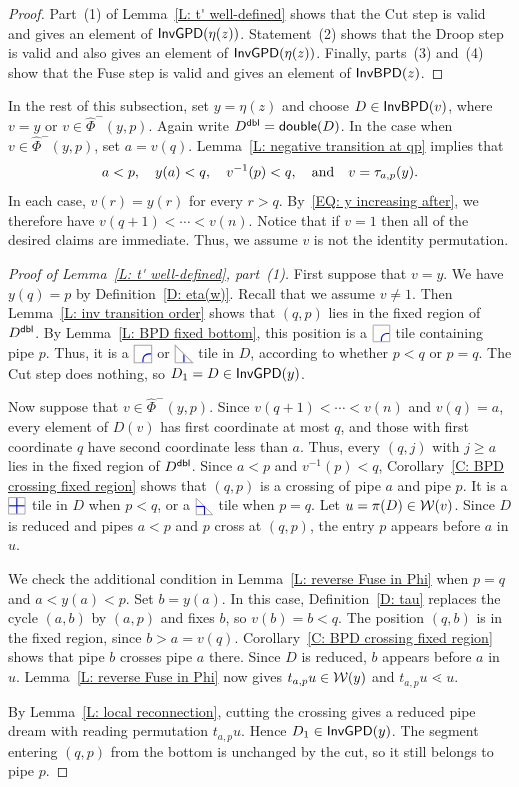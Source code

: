 \documentclass[10pt]{article}
\begin{document}
\begin{proof}
Part~(1) of Lemma~\ref{L: t' well-defined} shows that the  Cut
step is valid and gives an element of $\mathsf{InvGPD}(\eta(z))$.
Statement~(2) shows that the Droop step is valid and also gives an
element of $\mathsf{InvGPD}(\eta(z))$.
Finally, parts~(3) and~(4) show that the Fuse step is valid and
gives an element of $\mathsf{InvBPD}(z)$.
\end{proof}

In the rest of this subsection, set $y=\eta(z)$ and choose
$D\in\mathsf{InvBPD}(v)$, where $v=y$ or $v\in\hat\Phi^{-}(y,p)$.
Again write $D^{\mathsf{dbl}}=\mathsf{double}(D)$.
In the case when $v\in\hat\Phi^{-}(y,p)$, set $a=v(q)$.
Lemma~\ref{L: negative transition at qp} implies that 
\[a<p, \quad y(a)<q,
\quad v^{-1}(p)<q, \quad\text{and}\quad v=\tau_{a,p}(y).\]
In each case, $v(r)=y(r)$ for every $r>q$.
By~\eqref{EQ: y increasing after}, we therefore have
$v(q+1)<\cdots<v(n)$.
Notice that if $v=1$ then
all of the desired claims are immediate. 
Thus, we assume $v$ is not the identity permutation. 

\begin{proof}[Proof of Lemma~\ref{L: t' well-defined}, part~(1)]
First suppose that $v=y$.
We have $y(q)=p$ by Definition~\ref{D: eta(w)}.
Recall that we assume $v \neq 1$. 
Then Lemma~\ref{L: inv transition order} shows that $(q,p)$
lies in the fixed region of $D^{\mathsf{dbl}}$.
By Lemma~\ref{L: BPD fixed bottom}, this position is a $\CTILE$
tile containing pipe $p$.
Thus, it is a $\CTILE$ or $\CDIAG$ tile in $D$, according to whether
$p<q$ or $p=q$.
The Cut step does nothing, so $D_1=D\in\mathsf{InvGPD}(y)$.

Now suppose that $v\in\hat\Phi^{-}(y,p)$.
Since $v(q+1)<\cdots<v(n)$ and $v(q)=a$, every element of $D(v)$
has first coordinate at most $q$, and those with first coordinate $q$
have second coordinate less than $a$.
Thus, every $(q,j)$ with $j\geq a$ lies in the fixed region of $D^{\mathsf{dbl}}$.
Since $a<p$ and $v^{-1}(p)<q$, Corollary~\ref{C: BPD crossing fixed region}
shows that $(q,p)$ is a crossing of pipe $a$ and pipe $p$.
It is a $\PTILE$ tile in $D$ when $p<q$, or a $\PDIAG$ tile when $p=q$.
Let $u=\pi(D)\in\mathcal{W}(v)$.
Since $D$ is reduced and pipes $a<p$ and $p$ cross at $(q,p)$,
the entry $p$ appears before $a$ in $u$.

We check the additional condition in Lemma~\ref{L: reverse Fuse in Phi}
when $p=q$ and $a<y(a)<p$.
Set $b=y(a)$.
In this case, Definition~\ref{D: tau} replaces the cycle $(a,b)$
by $(a,p)$ and fixes $b$, so $v(b)=b<q$.
The position $(q,b)$ is in the fixed region, since $b>a=v(q)$.
Corollary~\ref{C: BPD crossing fixed region} shows that pipe $b$
crosses pipe $a$ there.
Since $D$ is reduced, $b$ appears before $a$ in $u$.
Lemma~\ref{L: reverse Fuse in Phi} now gives
$t_{a,p}u\in\mathcal{W}(y)$ and $t_{a,p}u\lessdot u$.

By Lemma~\ref{L: local reconnection}, cutting the crossing gives a
reduced pipe dream with reading permutation $t_{a,p}u$.
Hence $D_1\in\mathsf{InvGPD}(y)$.
The segment entering $(q,p)$ from the bottom is unchanged by the cut,
so it still belongs to pipe $p$.
\end{proof}
\end{document}
